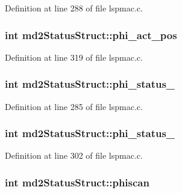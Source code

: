 Definition at line 288 of file lspmac.\-c.

\hypertarget{structmd2StatusStruct_a4de22995a72ff6e72a1a9ccab6d00620}{
\subsubsection[{phi\-\_\-act\-\_\-pos}]{\setlength{\rightskip}{0pt plus 5cm}int md2\-Status\-Struct\-::phi\-\_\-act\-\_\-pos}}\label{structmd2StatusStruct_a4de22995a72ff6e72a1a9ccab6d00620}


Definition at line 319 of file lspmac.\-c.

\hypertarget{structmd2StatusStruct_ad8b8fd90ffff43016e2adaab5ccbfa02}{
\subsubsection[{phi\-\_\-status\-\_\-1}]{\setlength{\rightskip}{0pt plus 5cm}int md2\-Status\-Struct\-::phi\-\_\-status\-\_}}\label{structmd2StatusStruct_ad8b8fd90ffff43016e2adaab5ccbfa02}


Definition at line 285 of file lspmac.\-c.

\hypertarget{structmd2StatusStruct_a0e6cea4c32cb34e602b9ac3d21259219}{
\subsubsection[{phi\-\_\-status\-\_\-2}]{\setlength{\rightskip}{0pt plus 5cm}int md2\-Status\-Struct\-::phi\-\_\-status\-\_}}\label{structmd2StatusStruct_a0e6cea4c32cb34e602b9ac3d21259219}


Definition at line 302 of file lspmac.\-c.

\hypertarget{structmd2StatusStruct_abe3d4a61a15f54590b061e23b45e659c}{
\subsubsection[{phiscan}]{\setlength{\rightskip}{0pt plus 5cm}int md2\-Status\-Struct\-::phiscan}}\label{structmd2StatusStruct_abe3d4a61a15f54590b061e23b45e659c}


